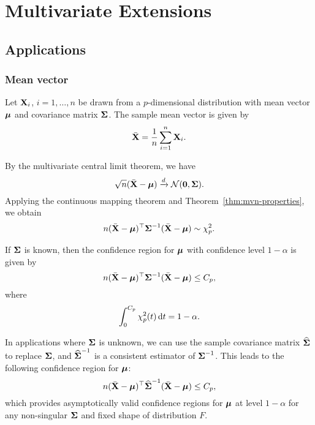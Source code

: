 \chapter{Multivariate Extensions}

\section{Applications}

\subsection{Mean vector}

Let \(\mathbf{X}_{i}\), \(i=1,\ldots,n\) be drawn from a \(p\)-dimensional distribution with mean vector \(\boldsymbol{\mu}\) and covariance matrix \(\boldsymbol{\Sigma}\). The sample mean vector is given by
\begin{equation*}
	\bar{\mathbf{X}}=\frac{1}{n}\sum_{i=1}^{n}\mathbf{X}_{i}.
\end{equation*}

By the multivariate central limit theorem, we have
\begin{equation*}
	\sqrt{n}(\bar{\mathbf{X}}-\boldsymbol{\mu})\xrightarrow{d}\mathcal{N}(\mathbf{0},\boldsymbol{\Sigma}).
\end{equation*}
Applying the continuous mapping theorem and Theorem~\ref{thm:mvn-properties}, we obtain
\begin{equation*}
	n(\bar{\mathbf{X}}-\boldsymbol{\mu})^{\top}\boldsymbol{\Sigma}^{-1}(\bar{\mathbf{X}}-\boldsymbol{\mu})\sim\chi^{2}_{p}.
\end{equation*}

If \(\boldsymbol{\Sigma}\) is known, then the confidence region for \(\boldsymbol{\mu}\) with confidence level \(1-\alpha\) is given by
\begin{equation*}
	n(\bar{\mathbf{X}}-\boldsymbol{\mu})^{\top}\boldsymbol{\Sigma}^{-1}(\bar{\mathbf{X}}-\boldsymbol{\mu})\leq C_{p},
\end{equation*}
where
\begin{equation*}
	\int_{0}^{C_{p}}\chi^{2}_{p}(t)\mathop{}\!\mathrm{d} t=1-\alpha.
\end{equation*}

In applications where \(\boldsymbol{\Sigma}\) is unknown, we can use the sample covariance matrix \(\widehat{\boldsymbol{\Sigma}}\) to replace \(\boldsymbol{\Sigma}\), and \(\widehat{\boldsymbol{\Sigma}}^{-1}\) is a consistent estimator of \(\boldsymbol{\Sigma}^{-1}\). This leads to the following confidence region for \(\boldsymbol{\mu}\):
\begin{equation*}
	n(\bar{\mathbf{X}}-\boldsymbol{\mu})^{\top}\widehat{\boldsymbol{\Sigma}}^{-1}(\bar{\mathbf{X}}-\boldsymbol{\mu})\leq C_{p},
\end{equation*}
which provides asymptotically valid confidence regions for \(\boldsymbol{\mu}\) at level \(1-\alpha\) for any non-singular \(\boldsymbol{\Sigma}\) and fixed shape of distribution \(F\).

